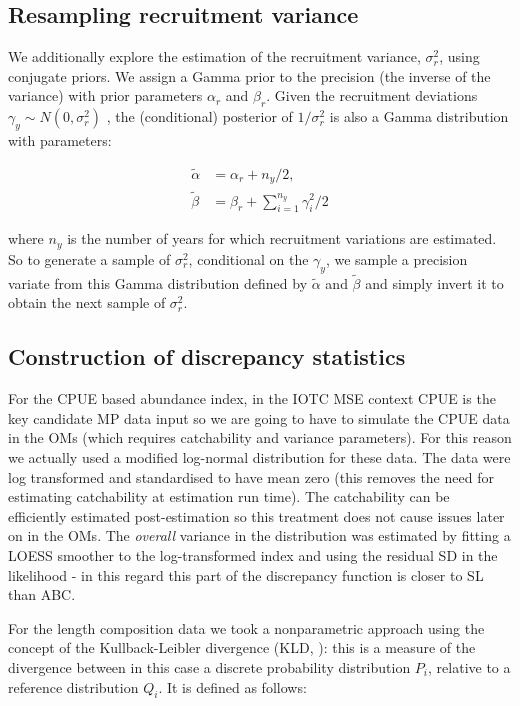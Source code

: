 \documentclass[12pt,a4paper,twoside,times,sky,standard]{csiroreport2017}
\newcommand{\alp}{\alpha}
\newcommand{\bet}{\beta}
\newcommand{\gam}{\gamma}
\newcommand{\sigr}{\sigma^2_r}
\begin{document}
\subsection*{Resampling recruitment variance}

We additionally explore the estimation of the recruitment variance, $\sigr$, using conjugate priors.
We assign a Gamma prior to the precision (the inverse of the variance) with prior parameters $\alp_r$
and $\bet_r$. Given the recruitment deviations $\gam_y\sim N(0,\sigr)$ , the (conditional) posterior of $1/\sigr$ is also a Gamma distribution with parameters:

\begin{align*}
  \tilde\alp &= \alp_r+n_y/2,\\
  \tilde\bet &= \bet_r+\sum\limits_{i=1}^{n_y}\gam^2_i/2
\end{align*}

where $n_y$ is the number of years for which recruitment variations are estimated. So to generate a
sample of $\sigr$, conditional on the $\gam_y$, we sample a precision variate from this Gamma distribution defined by $\tilde\alp$ and $\tilde\bet$ and simply invert it to obtain the next sample of $\sigr$.

\subsection*{Construction of discrepancy statistics}

For the CPUE based abundance index, in the IOTC MSE context CPUE is the key candidate MP data input so we are going to have to simulate the CPUE data in the OMs (which requires catchability and variance parameters). For this reason we actually used a modified log-normal distribution for these data. The data were log transformed and standardised to have mean zero (this removes the need for estimating catchability at estimation run time). The catchability can be efficiently estimated post-estimation so this treatment does not cause issues later on in the OMs. The \emph{overall} variance in the distribution was estimated by fitting a LOESS smoother to the log-transformed index and using the residual SD in the likelihood - in this regard this part of the discrepancy function is closer to SL than ABC.

For the length composition data we took a nonparametric approach using the concept of the Kullback-Leibler divergence (KLD, \cite{kl}): this is a measure of the divergence between in this case a discrete probability distribution $P_i$, relative to a reference distribution $Q_i$. It is defined as follows:
\end{document}
